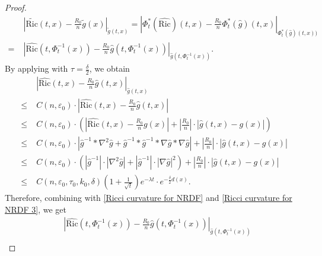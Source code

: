 \documentclass[12pt]{amsart}
\begin{document}
\begin{proof}
\begin{equation}\label{Ricci curvature for NRDF}
    \begin{split}
        &\; \left| \tilde{\mathrm{Ric}}(t, x) - \frac{R_0}{n}\tilde{g}(x) \right|_{\tilde{g}(t, x)} = \left| \Phi_t^*(\hat{\mathrm{Ric}})(t, x) - \frac{R_0}{n}\Phi_t^*(\hat{g})(t, x)\right|_{\Phi_t^{*}(\hat{g})(t, x))}\\
        =&\; \left|\hat{\mathrm{Ric}}(t, \Phi^{-1}_t(x)) - \frac{R_0}{n}\hat{g}(t, \Phi^{-1}_t(x)) \right|_{\hat{g}(t, \Phi^{-1}_t(x))}.
    \end{split}
\end{equation}
By applying  with $\tau = \frac{\delta}{2}$, we obtain
\begin{equation}\label{Ricci curvature for NRDF 3}
    \begin{split}
        &\; \left| \hat{\mathrm{Ric}}(t, x) - \frac{R_0}{n} \hat{g}(t, x) \right|_{\hat{g}(t, x)} \\
        \leq& \; C(n, \varepsilon_0) \cdot \left| \hat{\mathrm{Ric}}(t, x) - \frac{R_0}{n} \hat{g}(t, x) \right| \\
        \leq&\; C(n, \varepsilon_0)\cdot \left( \left| \hat{\mathrm{Ric}}(t, x) - \frac{R_0}{n}g(x) \right| + \left| \frac{R_0}{n} \right| \cdot \left| \hat{g}(t, x) - g(x) \right| \right)\\
        \leq&\; C(n, \varepsilon_0)\cdot \left| \hat{g}^{-1}*\nabla^2\hat{g} + \hat{g}^{-1} * \hat{g}^{-1} *\nabla\hat{g} * \nabla \hat{g} \right| + \left| \frac{R_0}{n} \right| \cdot \left| \hat{g}(t, x) - g(x) \right| \\
        \leq&\; C(n, \varepsilon_0)\cdot \left( |\hat{g}^{-1}|\cdot |\nabla^2 \hat{g}| + |\hat{g}^{-1}| \cdot |\nabla \hat{g}|^2 \right) + \left| \frac{R_0}{n} \right| \cdot \left| \hat{g}(t, x) - g(x) \right| \\
        \leq&\; C(n,\varepsilon_0,\tau_0, k_0, \delta) \left( 1 + \frac{1}{\sqrt{t}} \right) e^{-\lambda t}\cdot e^{-\frac{\delta}{2} d(x)}.
    \end{split}
\end{equation}
Therefore, combining with \eqref{Ricci curvature for NRDF} and \eqref{Ricci curvature for NRDF 3}, we get 
\begin{equation}\label{evolution equation of scalar curvature formula 2}
    \begin{split}
        &\left| \hat{\mathrm{Ric}}(t, \Phi_t^{-1}(x)) - \frac{R_0}{n}\hat{g}(t, \Phi_t^{-1}(x)) \right|_{\hat{g}(t, \Phi_t^{-1}(x))}\\

\end{split}
\end{equation}
\end{proof}
\end{document}
